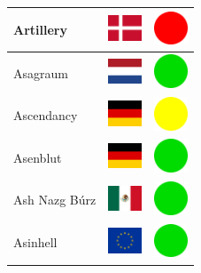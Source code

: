 \documentclass[12pt, a4paper, twoside]{report}
\begin{document}
\begin{center}
\begin{longtable}{|p{5cm}|p{2cm}|p{2cm}|}
 Artillery                                                  & \includegraphics[width=1cm]{../img/flags/dk} &   \includegraphics[width=1cm]{../likes/n} \\ \hline
 Asagraum                                                   & \includegraphics[width=1cm]{../img/flags/nl} &   \includegraphics[width=1cm]{../likes/y} \\ \hline
 Ascendancy                                                 & \includegraphics[width=1cm]{../img/flags/de} &   \includegraphics[width=1cm]{../likes/m} \\ \hline
 Asenblut                                                   & \includegraphics[width=1cm]{../img/flags/de} &   \includegraphics[width=1cm]{../likes/y} \\ \hline
 Ash Nazg Búrz                                              & \includegraphics[width=1cm]{../img/flags/mx} &   \includegraphics[width=1cm]{../likes/y} \\ \hline
 Asinhell                                                   & \includegraphics[width=1cm]{../img/flags/eu} &   \includegraphics[width=1cm]{../likes/y} \\ \hline

\end{longtable}
\end{center}
\end{document}
